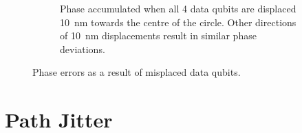 \begin{figure}
\begin{subfigure}[t]{0.7\textwidth}
		\caption{Phase accumulated when all 4 data qubits are displaced \SI{10}{\nano\metre} towards the centre of the circle. Other directions of \SI{10}{\nano\metre} displacements result in similar phase deviations.}
		\label{fig:inwarddisplacement}
	\end{subfigure}
	
	\caption{Phase errors as a result of misplaced data qubits.}
	\label{fig:overall_displacement}
\end{figure}

\section{Path Jitter}


